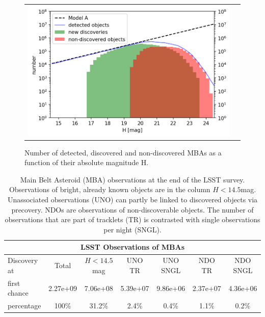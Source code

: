 \begin{figure}[tb!]
\begin{center}
\begin{tabular}{cc}
\includegraphics[width=0.70\linewidth]{figs/detection_discovered3.png}
\end{tabular}
\end{center}
\caption{Number of detected, discovered and non-discovered MBAs as a function of their absolute magnitude H. }
\label{fig:ndo_h}       %
\end{figure}

\begin{table}[tb!]
\begin{center}
\begin{tabular}{lcccccc}
\multicolumn{7}{c}{LSST Observations of MBAs}\\
\hline
Discovery at & Total & $H<14.5$mag & \gls{UNO} TR & \gls{UNO} SNGL & \gls{NDO} TR & \gls{NDO} SNGL \\
\hline
first chance & 2.27e+09 & 7.06e+08 & 5.39e+07 & 9.86e+06 & 2.37e+07 & 4.36e+06 \\
percentage   & 100\%  & 31.2\% & 2.4\% & 0.4\% & 1.1\% & 0.2\% \\\hline
\hline
\end{tabular}
\end{center}
\caption{Main Belt Asteroid (\gls{MBA}) observations at the end of the \gls{LSST} survey. Observations of bright, already known objects are in the column $H<14.5$mag.
Unassociated observations (\gls{UNO}) can partly be linked to discovered objects via \gls{precovery}. NDOs are observations of non-discoverable objects. The number of observations that are part of tracklets (TR) is contrasted with single observations per night (SNGL).\label{tab:mbaobs}}
\end{table}


